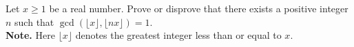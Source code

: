 \documentclass{subfile}
\begin{document}
%
%

	\begin{problem}
		Let $x \geq 1$ be a real number. Prove or disprove that there exists a positive integer $n$ such that $\gcd\left( \lfloor x \rfloor, \lfloor nx \rfloor \right)=1.$\\

		\textbf{Note.} Here $\lfloor x \rfloor$ denotes the greatest integer less than or equal to $x.$ %
	\end{problem}

%
\end{document}
